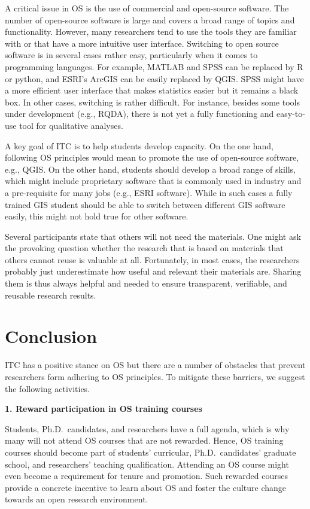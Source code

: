 \documentclass[gc, manuscript]{copernicus}
\begin{document}
A critical issue in OS is the use of commercial and open-source
software. The number of open-source software is large and covers a broad
range of topics and functionality. However, many researchers tend to use
the tools they are familiar with or that have a more intuitive user
interface. Switching to open source software is in several cases rather
easy, particularly when it comes to programming languages. For example,
MATLAB and SPSS can be replaced by R or python, and ESRI's ArcGIS can be
easily replaced by QGIS. SPSS might have a more efficient user interface
that makes statistics easier but it remains a black box. In other cases,
switching is rather difficult. For instance, besides some tools under
development (e.g., RQDA), there is not yet a fully functioning and
easy-to-use tool for qualitative analyses.

A key goal of ITC is to help students develop capacity. On the one hand,
following OS principles would mean to promote the use of open-source
software, e.g., QGIS. On the other hand, students should develop a broad
range of skills, which might include proprietary software that is
commonly used in industry and a pre-requisite for many jobs (e.g., ESRI
software). While in such cases a fully trained GIS student should be
able to switch between different GIS software easily, this might not
hold true for other software.

Several participants state that others will not need the materials. One
might ask the provoking question whether the research that is based on
materials that others cannot reuse is valuable at all. Fortunately, in
most cases, the researchers probably just underestimate how useful and
relevant their materials are. Sharing them is thus always helpful and
needed to ensure transparent, verifiable, and reusable research results.

\section{Conclusion}

ITC has a positive stance on OS but there are a number of obstacles that
prevent researchers form adhering to OS principles. To mitigate these
barriers, we suggest the following activities.

\textbf{1. Reward participation in OS training courses}

Students, Ph.D.~candidates, and researchers have a full agenda, which is
why many will not attend OS courses that are not rewarded. Hence, OS
training courses should become part of students' curricular,
Ph.D.~candidates' graduate school, and researchers' teaching
qualification. Attending an OS course might even become a requirement
for tenure and promotion. Such rewarded courses provide a concrete
incentive to learn about OS and foster the culture change towards an
open research environment.
\end{document}
